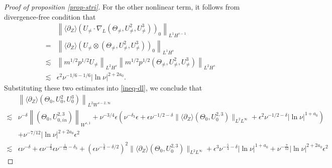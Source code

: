 \documentclass[12pt]{article}
\def\red#1{\textcolor{red}{#1}}
\newcommand{\wtb}{\langle\partial_Z\rangle }
\newcommand{\nm}[2]{\left\| #1 \right\| _{#2} }
\numberwithin{equation}{section}
\begin{document}
\begin{proof}[Proof of proposition \ref{prop-stri}]
    For the other nonlinear term, it follows from divergence-free condition that
    \begin{align*}
        ~ & \nm{\wtb \left( U_{\neq}\cdot  \nabla_L (\Theta_{\neq}, U_{\neq}^2, U_{\neq }^3) \right)_0}{L^1 H^{s-1}}\\
        = & \nm{\wtb \left( U_{\neq}\otimes (\Theta_{\neq}, U_{\neq}^2, U_{\neq }^3) \right)_0}{L^1 H^{s}}\\
        \lesssim &  \nm{ m^{1/2} p^{1/2} U_{\neq}}{L^2 H^{s}} \nm{m^{1/2} p^{1/2} (\Theta_{\neq}, U_{\neq}^2, U_{\neq }^3)}{L^2 H^{s}}  \\  
        \lesssim & \epsilon^2 \nu^{-1/6-1/6}|\ln{\nu}|^{2+2 a_0}.
    \end{align*}
	Substituting these two estimates into \eqref{ineq-dl}, we conclude that
	\begin{align*}
		~&\left\|  \wtb (\Theta_0,U_0^2,U_0^3) \right \|_{L^2 W^{s-2,\infty}}\\
		\lesssim & \nu ^{-\delta} \left \| (\Theta_0,  U_{0,in}^{2,3})  \right \| _{W^{s,1}}+\nu^{-3/4} \epsilon \left( \nu ^{-\delta_3} \epsilon+\epsilon\nu^{-1/2-\delta}\|\wtb (\Theta_0,U^{2,3}_0)\|_{L^2L^{\infty}}+\epsilon^2 \nu^{-1/2-\delta} |\ln{\nu}|^{1+a_0}  \right)  \\
        &+\nu^{-7/12} |\ln{\nu}|^{2+2a_0} \epsilon^2\\
		\lesssim & \epsilon \nu ^{-\delta} + \epsilon \nu^{-\frac23} \epsilon \nu^{-\frac{1}{12}-\delta_3} + (\epsilon \nu^{-\frac{5}{8}-\delta/2})^2 \|\wtb (\Theta_0,U^{2,3}_0)\|_{L^2L^{\infty}} + \epsilon^3 \nu^{-\frac{5}{4}-\delta}|\ln{\nu}|^{1+a_0} + \nu^{-\frac{7}{12}} |\ln{\nu}|^{2+2a_0} \epsilon^2

\end{align*}
\end{proof}
\end{document}
